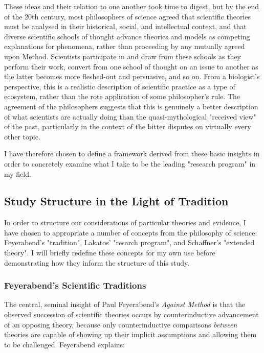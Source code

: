 These ideas and their relation to one another took time to digest, but by the end of the 20th century, most philosophers of science agreed that scientific theories must be analysed in their historical, social, and intellectual context, and that diverse scientific schools of thought advance theories and models as competing explanations for phenomena, rather than proceeding by any mutually agreed upon Method. Scientists participate in and draw from these schools as they perform their work, convert from one school of thought on an issue to another as the latter becomes more fleshed-out and persuasive, and so on. From a biologist's perspective, this is a realistic description of scientific practice as a type of ecosystem, rather than the rote application of some philosopher's rule. The agreement of the philosophers suggests that this is genuinely a better description of what scientists are actually doing than the quasi-mythological "received view" of the past, particularly in the context of the bitter disputes on virtually every other topic.

I have therefore chosen to define a framework derived from these basic insights in order to concretely examine what I take to be the leading "research program" in my field.
 
\subsection{Study Structure in the Light of Tradition}

In order to structure our considerations of particular theories and evidence, I have chosen to appropriate a number of concepts from the philosophy of science: Feyerabend's "tradition", Lakatos' "resarch program", and Schaffner's "extended theory". I will briefly redefine these concepts for my own use before demonstrating how they inform the structure of this study.

\subsubsection{Feyerabend's Scientific Traditions}

The central, seminal insight of Paul Feyerabend's \textit{Against Method} is that the observed succession of scientific theories occurs by counterinductive advancement of an opposing theory, because only counterinductive comparisons \textit{between} theories are capable of showing up their implicit assumptions and allowing them to be challenged. Feyerabend explains:

